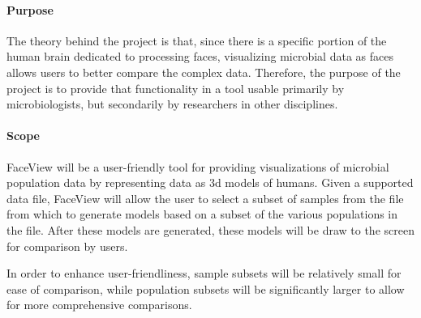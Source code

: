 \documentclass[letterpaper,10pt, onecolumn, draftclsnofoot]{IEEEtran}
\begin{document}
\paragraph{Purpose}
The theory behind the project is that, since there is a specific portion of the human brain dedicated to processing faces, visualizing microbial data as faces allows users to better compare the complex data. Therefore, the purpose of the project is to provide that functionality in a tool usable primarily by microbiologists, but secondarily by researchers in other disciplines.

\paragraph{Scope}
FaceView will be a user-friendly tool for providing visualizations of microbial population data by representing data as 3d models of humans. Given a supported data file, FaceView will allow the user to select a subset of samples from the file from which to generate models based on a subset of the various populations in the file. After these models are generated, these models will be draw to the screen for comparison by users.

In order to enhance user-friendliness, sample subsets will be relatively small for ease of comparison, while population subsets will be significantly larger to allow for more comprehensive comparisons.
\end{document}
